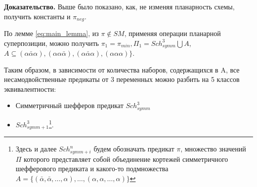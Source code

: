 \documentclass[12pt]{article}
\begin{document}
\textbf{Доказательство.}
Выше было показано, как, не изменяя планарность схемы, получить константы и $\pi_{neg}$. 

По лемме \ref{eq:main_lemma}, из $\pi \notin SM$, применяя операции планарной суперпозиции, можно получить 
$\pi_1 = \pi_{min}, \Pi_1 = Sch_{symm}^3 \bigcup A$,
$ A \subseteq(\alpha \bar{\alpha} \alpha), (\alpha \alpha \bar{\alpha}), (\alpha \bar{\alpha} \alpha), (\alpha \alpha \alpha) \} $.

Таким образом, в зависимости от количества наборов, содержащихся в A, все несамодвойственные
предикаты от 3 переменных можно разбить на 5 классов эквивалентности:
\begin{itemize}
\item{Симметричный шефферов предикат $Sch_{symm}^3$}
\item{$Sch_{symm+1}^3$\footnote{Здесь и далее $Sch_{symm+i}^n$ будем обозначать предикат $\pi$, множество значений $\Pi$
которого представляет собой объединение кортежей симметричного шефферового предиката и какого-то подмножества 
$A = \{ (\bar{\alpha}, \bar{\alpha}, \dots, \alpha), \dots, (\alpha, \alpha, \dots, \alpha) \} $}}.


\end{itemize}
\end{document}
